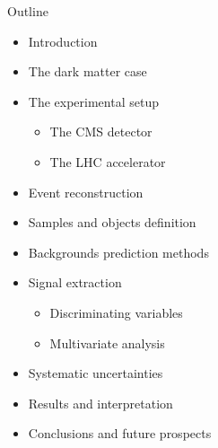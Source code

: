 \documentclass[8pt]{beamer}
\begin{document}
\begin{frame}{Outline}
\justifying
\begin{itemize}
\item Introduction
\item The dark matter case
\item The experimental setup
\begin{itemize}
\item The CMS detector
\item The LHC accelerator
\end{itemize}

\item Event reconstruction
\item Samples and objects definition
\item Backgrounds prediction methods
\item Signal extraction
\begin{itemize}
\item Discriminating variables
\item Multivariate analysis
\end{itemize}

\item Systematic uncertainties
\item Results and interpretation
\item Conclusions and future prospects
\end{itemize}
\end{frame}
\end{document}
